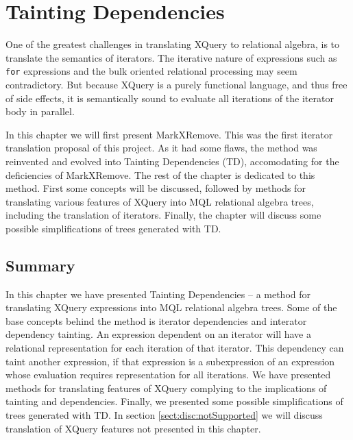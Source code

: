 \chapter{Tainting Dependencies}
\label{sect:translation}
\label{chapter:translation}


One of the greatest challenges in translating XQuery to relational algebra, is
to translate the semantics of iterators. The iterative nature of expressions
such as \texttt{for} expressions and the bulk oriented relational processing
may seem contradictory. But because XQuery is a purely functional language, and
thus free of side effects, it is semantically sound to evaluate all iterations
of the iterator body in parallel.

In this chapter we will first present MarkXRemove. This was the first iterator translation proposal of this
project. As it had some flaws, the method was reinvented and evolved into Tainting Dependencies (TD), accomodating
for the deficiencies of MarkXRemove. The rest of the chapter is dedicated to this method. First some concepts will
be discussed, followed by methods for translating various features of XQuery into MQL relational algebra trees,
including the translation of iterators. Finally, the chapter will discuss some possible simplifications of trees
generated with TD.













\section{Summary}
\label{sect:trans:summary}

In this chapter we have presented Tainting Dependencies -- a method for
translating XQuery expressions into MQL relational algebra trees. Some of the
base concepts behind the method is iterator dependencies and interator dependency tainting. An expression dependent
on an iterator will have a relational representation for each iteration of that iterator. This
dependency can taint another expression, if that expression is a subexpression
of an expression whose evaluation requires representation for all iterations.
We have presented methods for translating features of XQuery complying to the
implications of tainting and dependencies. Finally, we presented some possible
simplifications of trees generated with TD. In section
\ref{sect:disc:notSupported} we will discuss translation of XQuery features
not presented in this chapter.
